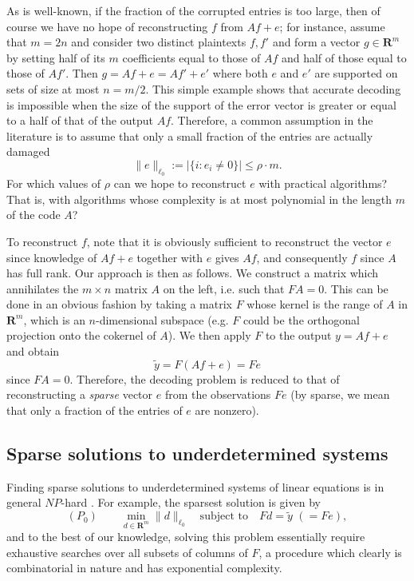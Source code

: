 \documentclass[11pt]{article}
\def\R{{{\mathbf{R}}}} %
\def\emph#1{{\it #1}} \def\textbf#1{{\bf #1}}
\newcommand{\<}{\langle}
\renewcommand{\>}{\rangle}
\numberwithin{equation}{section}
\begin{document}
As is well-known, if the fraction of the corrupted entries is too
large, then of course we have no hope of reconstructing $f$ from
$Af+e$; for instance, assume that $m = 2n$ and consider two distinct
plaintexts $f, f'$ and form a vector $g \in \R^m$ by setting half of
its $m$ coefficients equal to those of $Af$ and half of those equal to
those of $A f'$.  Then $g = Af + e = Af' + e'$ where both $e$ and $e'$
are supported on sets of size at most $n = m/2$. This simple example
shows that accurate decoding is impossible when the size of the
support of the error vector is greater or equal to a half of that of
the output $A f$. Therefore, a common assumption in the literature is
to assume that only a small fraction of the entries are actually
damaged
\begin{equation}
  \label{eq:l0}
\|e\|_{\ell_0} := |\{i : e_i \neq 0\}| \le \rho \cdot m.  
\end{equation}
For which values of $\rho$ can we hope to reconstruct $e$ with
practical algorithms? That is, with algorithms whose complexity is at
most polynomial in the length $m$ of the code $A$?

To reconstruct $f$, note that it is obviously sufficient to
reconstruct the vector $e$ since knowledge of $Af+e$ together with $e$
gives $Af$, and consequently $f$ since $A$ has full rank.  Our
approach is then as follows. We construct a matrix which annihilates
the $m \times n$ matrix $A$ on the left, i.e. such that $F A = 0$.
This can be done in an obvious fashion by taking a matrix $F$ whose
kernel is the range of $A$ in $\R^m$, which is an $n$-dimensional
subspace (e.g. $F$ could be the orthogonal projection onto the
cokernel of $A$). We then apply $F$ to the output $y = A f + e$ and
obtain
\begin{equation}
  \label{eq:Be}
  \tilde y = F(Af + e) = F e
\end{equation}
since $F A = 0$.  Therefore, the decoding problem is reduced to that of
reconstructing a \emph{sparse} vector $e$ from the observations $F e$
(by sparse, we mean that only a fraction of the entries of $e$ are
nonzero).

\subsection{Sparse solutions to underdetermined systems}

Finding sparse solutions to underdetermined systems of linear
equations is in general $NP$-hard \cite{Natarajan,Equivl0l1}. For
example, the sparsest solution is given by 
\begin{equation}
  \label{eq:P0}
  (P_0) \quad \quad 
\min_{d \in \R^m} \|d\|_{\ell_0} \quad \text{subject to} 
\quad F d = \tilde y \,\, ( = F e), 
\end{equation}
and to the best of our knowledge, solving this problem essentially
require exhaustive searches over all subsets of columns of $F$, a
procedure which clearly is combinatorial in nature and has exponential
complexity.
\end{document}

